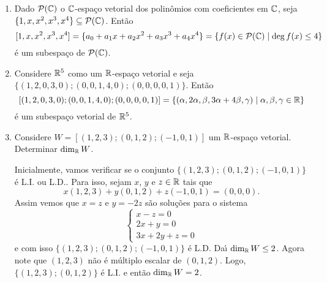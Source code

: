 \begin{exemplo}
	\begin{enumerate}[label={\arabic*})]
		\item Dado $\mathcal{P}(\mathbb{C})$ o $\mathbb{C}$-espa\c{c}o vetorial dos polin\^omios com coeficientes em $\mathbb{C}$, seja $\{1,x,x^2,x^3,x^4\} \subseteq \mathcal{P}(\mathbb{C})$. Ent\~ao
		\[
			[1,x,x^2,x^3,x^4] = \{a_0 + a_1x + a_2x^2 + a_3x^3 + a_4x^4\} = \{f(x) \in \mathcal{P}(\mathbb{C}) \mid \deg f(x) \le 4\}
		\]
		\'e um subespa\c{c}o de $\mathcal{P}(\mathbb{C})$.
		\item Considere $\mathbb{R}^5$ como um $\mathbb{R}$-espa\c{c}o vetorial e seja $\{(1,2,0,3,0);(0,0,1,4,0);(0,0,0,0,1)\}$. Ent\~ao
		\[
			[(1,2,0,3,0);(0,0,1,4,0);(0,0,0,0,1)] = \{(\alpha, 2\alpha,\beta,3\alpha + 4\beta,\gamma) \mid \alpha, \beta, \gamma \in \mathbb{R}\}
		\]
		\'e um subespa\c{c}o vetorial de $\mathbb{R}^5$.
		\item Considere $W = [(1,2,3);(0,1,2);(-1,0,1)]$ um $\mathbb{R}$-espa\c{c}o vetorial. Determinar $\dim_{\mathbb{R}} W$.
		\begin{solucao}
			Inicialmente, vamos verificar se o conjunto $\{(1,2,3);(0,1,2);(-1,0,1)\}$ \'e L.I. ou L.D.. Para isso, sejam $x$, $y$ e $z \in \mathbb{R}$ tais que
			\[
				x(1,2,3) + y(0,1,2) + z(-1,0,1) = (0,0,0).
			\]
			Assim vemos que $x = z$ e $y = -2z$ s\~ao solu\c{c}\~oes para o sistema
			\[
				\begin{cases}
					x - z = 0\\
					2x + y = 0\\
					3x + 2y + z = 0
				\end{cases}
			\]
			e com isso $\{(1,2,3);(0,1,2);(-1,0,1)\}$ \'e L.D. Da{\'\i} $\dim_{\mathbb{R}} W \le 2$. Agora note que $(1,2,3)$ n\~ao \'e m\'ultiplo escalar de $(0,1,2)$. Logo, $\{(1,2,3); (0,1,2)\}$ \'e L.I. e ent\~ao $\dim_{\mathbb{R}} W = 2$.
		\end{solucao}
		

\end{enumerate}
\end{exemplo}
